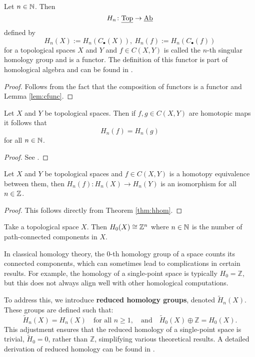 \begin{thm}\label{thm:hfunc}
  Let $n \in \mathbb{N}$. Then \[H_n\colon \underline{\rm Top} \to \underline{\rm Ab} \]
  defined by \[H_n(X) := H_n(C_\bullet(X)), \: H_n(f) := H_n(C_\bullet(f))\]
  for a topological spaces $X$ and $Y$ and $f \in C(X, Y)$ is called the $n$-th singular homology group and is a functor. The definition of this functor is part of homological algebra and can be found in \cite[p. 329f.]{rotman2009}. 
\end{thm}

\begin{proof}
  Follows from the fact that the composition of functors is a functor and Lemma \ref{lem:cfunc}.
\end{proof}

\begin{thm}\label{thm:hhom}
  Let $X$ and $Y$ be topological spaces. Then if $f, g\in C(X, Y)$ are homotopic maps it follows that \[H_n(f) = H_n(g)\] for all $n \in \mathbb{N}$.
\end{thm}

\begin{proof}
  See \cite[p. 112f]{hatcher}.
\end{proof}

\begin{col}
  Let $X$ and $Y$ be topological spaces and $f \in C(X, Y)$ is a homotopy equivalence between them, then $H_n(f)\colon H_n(X) \to H_n(Y)$ is an isomorphism for all $n \in \mathbb{Z}$.
\end{col}

\begin{proof}
  This follows directly from Theorem \ref{thm:hhom}.
\end{proof}

\begin{ex}
  Take a topological space $X$. Then $H_0(X) \cong \mathbb{Z}^n$ where $n \in \mathbb{N}$ is the number of path-connected components in $X$. 
\end{ex}

In classical homology theory, the \( 0 \)-th homology group of a space counts its connected components, which can sometimes lead to complications in certain results. For example, the homology of a single-point space is typically \( H_0 = \mathbb{Z} \), but this does not always align well with other homological computations.

To address this, we introduce \textbf{reduced homology groups}, denoted \( \tilde{H}_n(X) \). These groups are defined such that:
\[
\tilde{H}_n(X) = H_n(X) \quad \text{for all } n \geq 1, \quad \text{and} \quad \tilde{H}_0(X) \oplus \mathbb{Z} = H_0(X).
\]
This adjustment ensures that the reduced homology of a single-point space is trivial, \( \tilde{H}_0 = 0 \), rather than \( \mathbb{Z} \), simplifying various theoretical results. A detailed derivation of reduced homology can be found in \cite[p.~110]{hatcher}.

